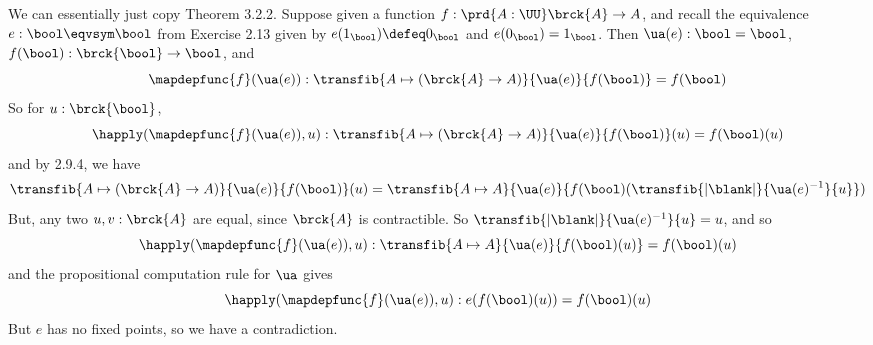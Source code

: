  \soln
We can essentially just copy Theorem 3.2.2.  Suppose given a function $f :
\prd{A:\UU} \brck{A} \to A$, and recall the equivalence $e : \bool \eqvsym
\bool$ from Exercise 2.13 given by $e(1_{\bool}) \defeq 0_{\bool}$ and
$e(0_{\bool}) = 1_{\bool}$.  Then $\ua(e) : \bool = \bool$, $f(\bool)
: \brck{\bool} \to \bool$, and
\[
  \mapdepfunc{f}(\ua(e)) : 
  \transfib{A \mapsto (\brck{A} \to A)}{\ua(e)}{f(\bool)} = f(\bool)
\]
So for $u : \brck{\bool}$,
\[
  \happly(\mapdepfunc{f}(\ua(e)), u) : 
  \transfib{A \mapsto (\brck{A} \to A)}{\ua(e)}{f(\bool)}(u) = f(\bool)(u)
\]
and by 2.9.4, we have
\[
  \transfib{A \mapsto (\brck{A} \to A)}{\ua(e)}{f(\bool)}(u) 
  =
  \transfib{A \mapsto A}{\ua(e)}{f(\bool)(\transfib{\lvert \blank
  \rvert}{\ua(e)^{-1}}{u}})
\]
But, any two $u, v : \brck{A}$ are equal, since $\brck{A}$ is contractible.  So
$\transfib{\lvert\blank\rvert}{\ua(e)^{-1}}{u} = u$, and so
\[
  \happly(\mapdepfunc{f}(\ua(e)), u) : 
  \transfib{A \mapsto A}{\ua(e)}{f(\bool)(u)}
  = f(\bool)(u)
\]
and the propositional computation rule for $\ua$ gives
\[
  \happly(\mapdepfunc{f}(\ua(e)), u) : 
  e(f(\bool)(u)) = f(\bool)(u)
\]
But $e$ has no fixed points, so we have a contradiction.
